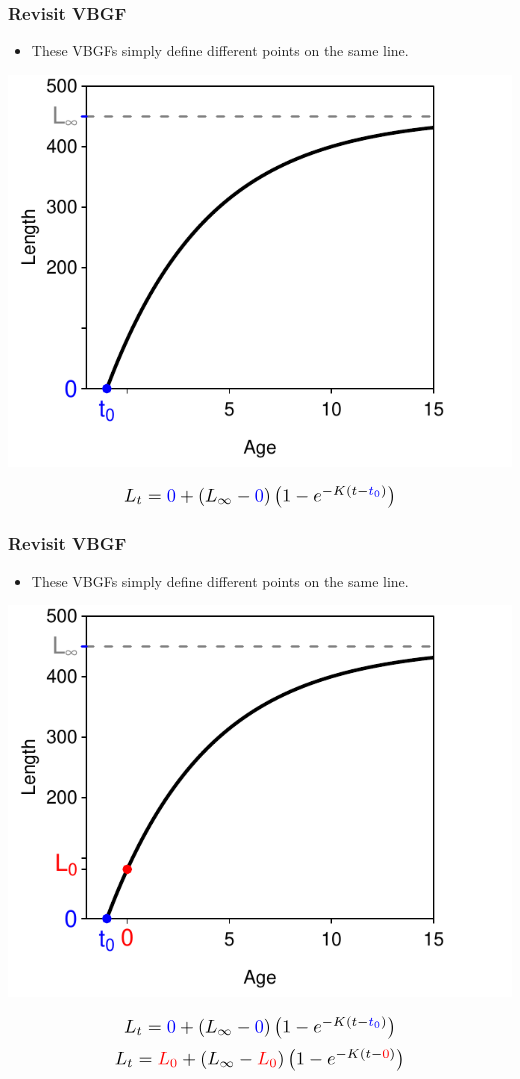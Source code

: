 \documentclass[xcolor=dvipsnames,t]{beamer}\usepackage[]{graphicx}\usepackage[]{color}
\makeatletter
\newenvironment{knitrout}{}{} %
\newcommand*{\Scale}[2][4]{\scalebox{#1}{\ensuremath{#2}}}%
\def\mathcolor#1#{\@mathcolor{#1}}
\def\@mathcolor#1#2#3{%
  \protect\leavevmode
  \begingroup
    \color#1{#2}#3%
  \endgroup
}
\makeatother
\begin{document}
\begin{frame}[fragile]
\frametitle{Revisit VBGF}
\vspace{-12pt}
\begin{itemize}
  \item These VBGFs simply define different points on the same line.
\end{itemize}
\smallskip
\begin{knitrout}\footnotesize
{}\color{fgcolor}

{\centering \includegraphics[width=.5\linewidth]{Figs/pointsOnLineA-1} 

}



\end{knitrout}
\[\Scale[1.3]{ L_{t} = \mathcolor{blue}{0} + (L_{\infty}-\mathcolor{blue}{0})\left(1-e^{-K(t-\mathcolor{blue}{t_{0}})}\right) }\]
\end{frame}

\begin{frame}[fragile]
\frametitle{Revisit VBGF}
\vspace{-12pt}
\begin{itemize}
  \item These VBGFs simply define different points on the same line.
\end{itemize}
\smallskip
\begin{knitrout}\footnotesize
{}\color{fgcolor}

{\centering \includegraphics[width=.5\linewidth]{Figs/pointsOnLineB-1} 

}



\end{knitrout}
\[\Scale[1.3]{ L_{t} = \mathcolor{blue}{0} + (L_{\infty}-\mathcolor{blue}{0})\left(1-e^{-K(t-\mathcolor{blue}{t_{0}})}\right) }\]
\[\Scale[1.3]{ L_{t} = \mathcolor{red}{L_{0}} + (L_{\infty}-\mathcolor{red}{L_{0}})\left(1-e^{-K(t-\mathcolor{red}{0})}\right) }\]

\end{frame}
\end{document}
